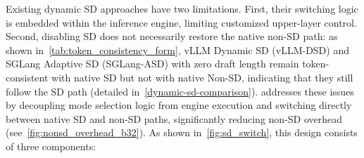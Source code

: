 Existing dynamic SD approaches have two limitations. First, their switching logic is embedded within the inference engine, limiting customized upper-layer control. Second, disabling SD does not necessarily restore the native non-SD path: %
as shown in~\autoref{tab:token_consistency_form}, vLLM Dynamic SD (vLLM-DSD) and SGLang Adaptive SD (SGLang-ASD) with zero draft length remain token-consistent with native SD but not with native Non-SD, indicating that they still follow the SD path 
(detailed in~\autoref{dynamic-sd-comparison}). %
\sysname %
addresses these issues by decoupling mode selection logic from engine execution and switching directly between native SD and non-SD paths, significantly reducing non-SD overhead (see~\autoref{fig:nonsd_overhead_b32}). As shown in~\autoref{fig:sd_switch}, this design consists of three components: %



